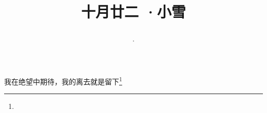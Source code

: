 \title{\date[d=22,m=11,y=2024][year:cn-y,年,month:cn,day:cn,日,·,weekday]·十月廿二 ·小雪}
我在绝望中期待，我的离去就是留下\footnote{ }

